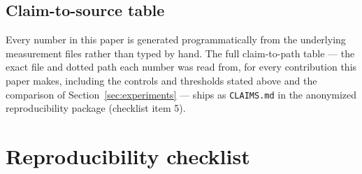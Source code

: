 \documentclass{article}
\begin{document}


\FloatBarrier

\subsection{Claim-to-source table}
\label{sec:claims-ledger}

Every number in this paper is generated programmatically from the underlying measurement files
rather than typed by hand. The full claim-to-path table — the exact file and dotted path each
number was read from, for every contribution this paper makes, including the controls and
thresholds stated above and the comparison of Section~\ref{sec:experiments} — ships as
\texttt{CLAIMS.md} in the anonymized reproducibility package (checklist item 5).

\clearpage
\section*{Reproducibility checklist}

\end{document}
